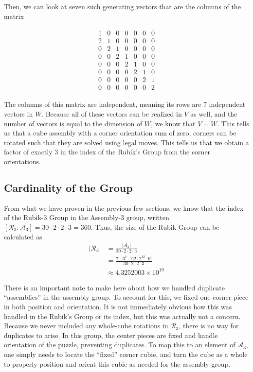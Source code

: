 \documentclass[10pt,letterpaper]{report}
\begin{document}
Then, we can look at seven such generating vectors that are the columns of the matrix

\begin{align*}
\begin{matrix}
1 & 0 & 0 & 0 & 0 & 0 & 0 \\ 
2 & 1 & 0 & 0 & 0 & 0 & 0 \\ 
0 & 2 & 1 & 0 & 0 & 0 & 0 \\ 
0 & 0 & 2 & 1 & 0 & 0 & 0 \\ 
0 & 0 & 0 & 2 & 1 & 0 & 0 \\ 
0 & 0 & 0 & 0 & 2 & 1 & 0 \\ 
0 & 0 & 0 & 0 & 0 & 2 & 1 \\
0 & 0 & 0 & 0 & 0 & 0 & 2 
\end{matrix} 
\end{align*}

The columns of this matrix are independent, meaning its rows are 7 independent vectors in $W$.  Because all of these vectors can be realized in $V$ as well, and the number of vectors is equal to the dimension of $W$, we know that $V=W$.  This tells us that a cube assembly with a corner orientation sum of zero, corners can be rotated such that they are solved using legal moves.  This tells us that we obtain a factor of exactly 3 in the index of the Rubik's Group from the corner orientations.

\subsection{Cardinality of the Group}
From what we have proven in the previous few sections, we know that the index of the Rubik-3 Group in the Assembly-3 group, written $[\mathcal{R}_3 : \mathcal{A}_3] = 30 \cdot 2 \cdot 2 \cdot 3 = 360$.  Thus, the size of the Rubik Group can be calculated as \begin{align*}
|\mathcal{R}_3| &= \frac{|\mathcal{A}_3|}{30 \cdot 2 \cdot 2 \cdot 3} \\
&= \frac{7! \cdot 3^7 \cdot 12! \cdot 2^{12} \cdot 6!}{30 \cdot 2 \cdot 2 \cdot 3} \\
&\approx 4.3252003 \times 10^{19}
\end{align*}

There is an important note to make here about how we handled duplicate ``assemblies'' in the assembly group.  To account for this, we fixed one corner piece in both position and orientation.  It is not immediately obvious how this was handled in the Rubik's Group or its index, but this was actually not a concern.  Because we never included any whole-cube rotations in $\mathcal{R}_3$, there is no way for duplicates to arise.  In this group, the center pieces are fixed and handle orientation of the puzzle, preventing duplicates.  To map this to an element of $\mathcal{A}_3$, one simply needs to locate the ``fixed'' corner cubie, and turn the cube as a whole to properly position and orient this cubie as needed for the assembly group. \\
\end{document}
